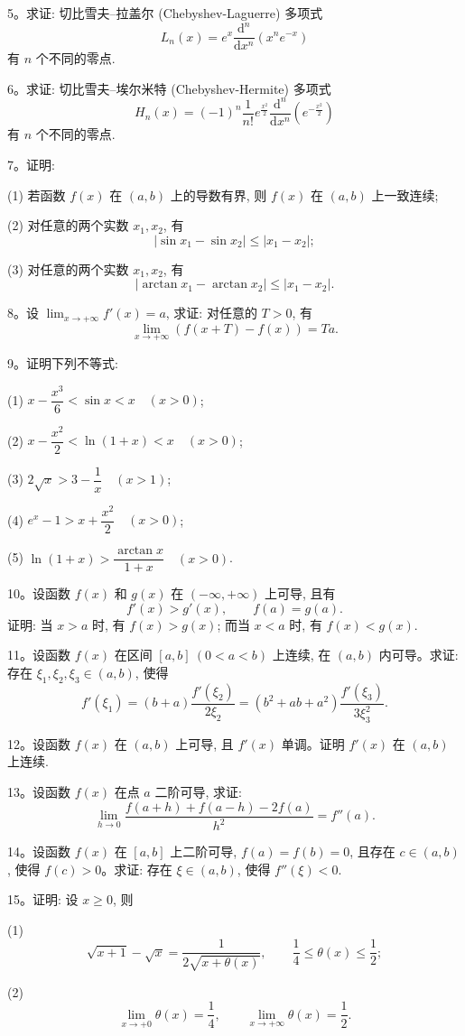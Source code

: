 5。求证: 切比雪夫--拉盖尔 (Chebyshev-Laguerre) 多项式
\[
  L_n(x)=e^x\frac{\mathrm d^n}{\mathrm dx^n}(x^ne^{-x})
\]
有 $n$ 个不同的零点.

6。求证: 切比雪夫--埃尔米特 (Chebyshev-Hermite) 多项式
\[
  H_n(x)=(-1)^n\frac1{n!}e^{\frac{x^2}2}\frac{\mathrm d^n}{\mathrm dx^n}\left(e^{-\frac{x^2}2}\right)
\]
有 $n$ 个不同的零点.

7。证明:

(1) 若函数 $f(x)$ 在 $(a,b)$ 上的导数有界, 则 $f(x)$ 在 $(a,b)$ 上一致连续;

(2) 对任意的两个实数 $x_1,x_2$, 有
\[
  |\sin x_1-\sin x_2|\leqslant |x_1-x_2|;
\]

(3) 对任意的两个实数 $x_1,x_2$, 有
\[
  |\arctan x_1-\arctan x_2|\leqslant |x_1-x_2|.
\]

8。设 $\lim_{x\to+\infty}f'(x)=a$, 求证: 对任意的 $T>0$, 有
\[
  \lim_{x\to+\infty}(f(x+T)-f(x))=Ta.
\]

9。证明下列不等式:

(1) $x-\dfrac{x^3}6<\sin x<x\quad (x>0)$;

(2) $x-\dfrac{x^2}2<\ln(1+x)<x\quad (x>0)$;

(3) $2\sqrt x>3-\dfrac1x\quad (x>1)$;

(4) $e^x-1>x+\dfrac{x^2}2\quad (x>0)$;

(5) $\ln(1+x)>\dfrac{\arctan x}{1+x}\quad (x>0)$.

10。设函数 $f(x)$ 和 $g(x)$ 在 $(-\infty,+\infty)$ 上可导, 且有
\[
  f'(x)>g'(x),\qquad f(a)=g(a).
\]
证明: 当 $x>a$ 时, 有 $f(x)>g(x)$; 而当 $x<a$ 时, 有 $f(x)<g(x)$.

11。设函数 $f(x)$ 在区间 $[a,b]\ (0<a<b)$ 上连续, 在 $(a,b)$ 内可导。求证: 存在 $\xi_1,\xi_2,\xi_3\in(a,b)$, 使得
\[
  f'(\xi_1)=(b+a)\frac{f'(\xi_2)}{2\xi_2}
  =(b^2+ab+a^2)\frac{f'(\xi_3)}{3\xi_3^2}.
\]

12。设函数 $f(x)$ 在 $(a,b)$ 上可导, 且 $f'(x)$ 单调。证明 $f'(x)$ 在 $(a,b)$ 上连续.

13。设函数 $f(x)$ 在点 $a$ 二阶可导, 求证:
\[
  \lim_{h\to0}\frac{f(a+h)+f(a-h)-2f(a)}{h^2}=f''(a).
\]

14。设函数 $f(x)$ 在 $[a,b]$ 上二阶可导, $f(a)=f(b)=0$, 且存在 $c\in(a,b)$, 使得 $f(c)>0$。求证: 存在 $\xi\in(a,b)$, 使得 $f''(\xi)<0$.

15。证明: 设 $x\geqslant0$, 则

(1)
\[
  \sqrt{x+1}-\sqrt x=\frac1{2\sqrt{x+\theta(x)}},\qquad
  \frac14\leqslant\theta(x)\leqslant\frac12;
\]

(2)
\[
  \lim_{x\to+0}\theta(x)=\frac14,\qquad
  \lim_{x\to+\infty}\theta(x)=\frac12.
\]

